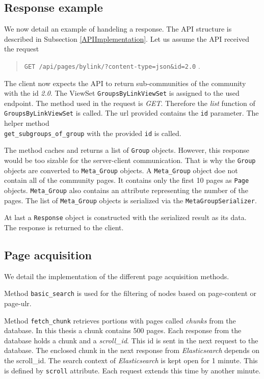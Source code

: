\subsection{Response example} \label{dixAPIResponse}
 We now detail an example of handeling a response. The API structure is described in Subsection \ref{APIImplementation}. Let us assume the API received the request 
\begin{quotation}
 \texttt{GET /api/pages/bylink/?content-type=json\&id=2.0} . 
\end{quotation}
The client now expects the API to return sub-communities of the community with the id \textit{2.0}. The ViewSet \texttt{GroupsByLinkViewSet} is assigned to the used endpoint. The method used in the request is \textit{GET}. Therefore the \textit{list} function of \texttt{GroupsByLinkViewSet} is called. The url provided contains the \texttt{id} parameter. The helper method \\ \texttt{get\_subgroups\_of\_group} with the provided \texttt{id} is called. 

The method caches and returns a list of \texttt{Group} objects. However, this response would be too sizable for the server-client communication. That is why the \texttt{Group} objects are converted to \texttt{Meta\_Group} objects. A \texttt{Meta\_Group} object doe not contain all of the community pages. It contains only the first 10 pages as \texttt{Page} objects. \texttt{Meta\_Group} also contains an attribute representing the number of the pages. The list of \texttt{Meta\_Group} objects is serialized via the \texttt{MetaGroupSerializer}. 

At last a \texttt{Response} object is constructed with the serialized result as its data. The response is returned to the client.

\subsection{Page acquisition} \label{dixRepositories}
We detail the implementation of the different page acquisition methods.

Method \texttt{basic\_search} is used for the filtering of nodes based on page-content or page-ulr. 

Method \texttt{fetch\_chunk} retrieves portions with pages called \textit{chunks} from the database. In this thesis a chunk contains 500 pages. Each response from the database holds a chunk and a \textit{scroll\_id}. This id is sent in the next request to the database. The enclosed chunk in the next response from \textit{Elasticsearch}  depends on the scroll\_id. The search context of \textit{Elasticsearch} is kept open for 1 minute. This is defined by \texttt{scroll} attribute. Each request extends this time by another minute. 


